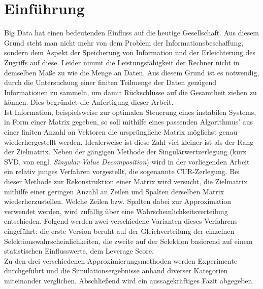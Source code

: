 \documentclass[12pt,a4paper,twoside]{article}
\begin{document}
\section{Einführung}
	Big Data hat einen bedeutenden Einfluss auf die heutige Gesellschaft. Aus diesem Grund steht man nicht mehr von dem Problem der Informationsbeschaffung, sondern dem Aspekt der Speicherung von Information und der Erleichterung des Zugriffs auf diese.
	Leider nimmt die Leistungsfähigkeit der Rechner nicht in demselben Maße zu wie die Menge an Daten. Aus diesem 
	Grund ist es notwendig, durch die Untersuchung einer finiten Teilmenge der Daten genügend Informationen zu 
	sammeln, um damit Rückschlüsse auf die Gesamtheit ziehen zu können. Dies begründet die Anfertigung dieser Arbeit.\\
	Ist Information, beispielsweise zur optimalen Steuerung eines instabilen Systems, in Form einer Matrix gegeben, so soll mithilfe eines passenden Algorithmus' aus einer finiten Anzahl an Vektoren die ursprüngliche Matrix möglichst genau wiederhergestellt werden.
	Idealerweise ist diese Zahl viel kleiner ist als der Rang der Zielmatrix.
	Neben der gängigen Methode der Singulärwertzerlegung (kurz SVD, von engl. \textit{Singular Value Decomposition}) wird in der vorliegenden Arbeit ein relativ junges Verfahren vorgestellt, die sogenannte CUR-Zerlegung.
	Bei dieser Methode zur Rekonstruktion einer Matrix wird versucht, die Zielmatrix mithilfe einer geringen Anzahl 
	an Zeilen und Spalten derselben Matrix wiederherzustellen. Welche Zeilen bzw. Spalten dabei zur Approximation 
	verwendet werden, wird zufällig über eine Wahrscheinlichkeitsverteilung entschieden. Folgend werden zwei 
	verschiedene Varianten dieses Verfahrens eingeführt: die erste Version beruht auf der Gleichverteilung der einzelnen Selektionswahrscheinlichkeiten, die zweite auf der Selektion basierend auf einem statistischen Einflusswerte, dem Leverage Score. \\
	Zu den drei verschiedenen Approximierungsmethoden werden Experimente durchgeführt und die Simulationsergebnisse
	anhand diverser Kategorien miteinander verglichen. Abschließend wird ein aussagekräftiges Fazit abgegeben.
	\newpage
\end{document}
